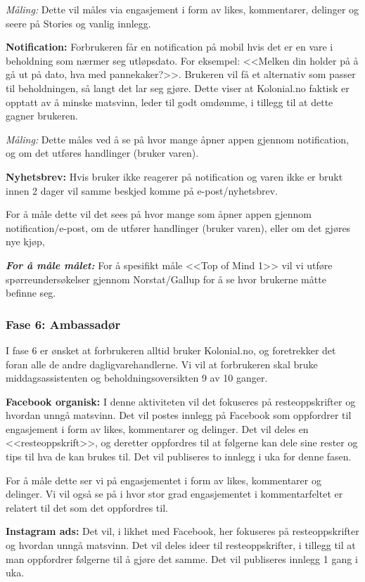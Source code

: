 \textit{Måling:} Dette vil måles via engasjement i form av likes, kommentarer, delinger og seere på Stories og vanlig innlegg. 

\textbf{Notification:} Forbrukeren får en notification på mobil hvis det er en vare i beholdning som nærmer seg utløpsdato. For eksempel: <<Melken din holder på å gå ut på dato, hva med pannekaker?>>. Brukeren vil få et alternativ som passer til beholdningen, så langt det lar seg gjøre. Dette viser at Kolonial.no faktisk er opptatt av å minske matsvinn, leder til godt omdømme, i tillegg til at dette gagner brukeren. 

\textit{Måling:} Dette måles ved å se på hvor mange åpner appen gjennom notification, og om det utføres handlinger (bruker varen).

\textbf{Nyhetsbrev:} Hvis bruker ikke reagerer på notification og varen ikke er brukt innen 2 dager vil samme beskjed komme på e-post/nyhetsbrev. 

For å måle dette vil det sees på hvor mange som åpner appen gjennom notification/e-post, om de utfører handlinger (bruker varen), eller om det gjøres nye kjøp, 

\textbf{\textit{For å måle målet:}} For å spesifikt måle <<Top of Mind 1>> vil vi utføre spørreundersøkelser gjennom Norstat/Gallup for å se hvor brukerne måtte befinne seg. 


\subsubsection{\textbf{Fase 6: Ambassadør}}
I fase 6 er ønsket at forbrukeren alltid bruker Kolonial.no, og foretrekker det foran alle de andre dagligvarehandlerne. Vi vil at forbrukeren skal bruke middagsassistenten og beholdningsoversikten 9 av 10 ganger. 

\textbf{Facebook organisk:} I denne aktiviteten vil det fokuseres på resteoppskrifter og hvordan unngå matsvinn. Det vil postes innlegg på Facebook som oppfordrer til engasjement i form av likes, kommentarer og delinger. Det vil deles en <<resteoppskrift>>, og deretter oppfordres til at følgerne kan dele sine rester og tips til hva de kan brukes til. Det vil publiseres to innlegg i uka for denne fasen. 

For å måle dette ser vi på engasjementet i form av likes, kommentarer og delinger. Vi vil også se på i hvor stor grad engasjementet i kommentarfeltet er relatert til det som det oppfordres til.

\textbf{Instagram ads:} Det vil, i likhet med Facebook, her fokuseres på resteoppskrifter og hvordan unngå matsvinn. Det vil deles ideer til resteoppskrifter, i tillegg til at man oppfordrer følgerne til å gjøre det samme. Det vil publiseres innlegg 1 gang i uka. 

